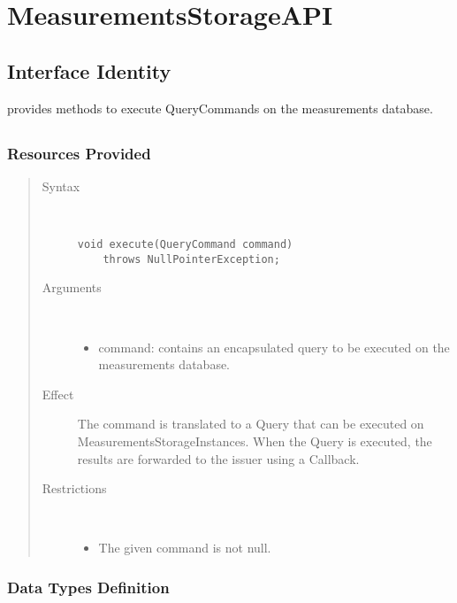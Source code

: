 \section{MeasurementsStorageAPI}
\label{api:measurements-storage-api}

\subsection{Interface Identity}

\npar {} provides methods to execute
QueryCommands on the measurements database.

\subsection{}

\subsubsection{Resources Provided}

\begin{quote}
	\begin{description}
		\item[Syntax] \ 
		\begin{verbatim}
void execute(QueryCommand command) 
    throws NullPointerException;
		\end{verbatim}
		\item[Arguments] \
		\begin{itemize}
			\item command: contains an encapsulated query to be executed on the
			measurements database.
		\end{itemize}
		\item[Effect] The command is translated to a Query that can be executed on
		MeasurementsStorageInstances. When the Query is executed, the results are
		forwarded to the issuer using a Callback.
		\item[Restrictions] \ 
		\begin{itemize}
			\item The given command is not null.
		\end{itemize}
	\end{description} 
\end{quote}

\subsubsection{Data Types Definition}


